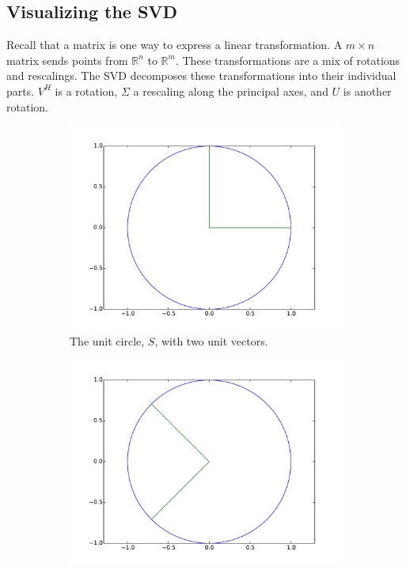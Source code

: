 \subsection*{Visualizing the SVD}

Recall that a matrix is one way to express a linear transformation.
A $m\times n$ matrix sends points from $\mathbb{R}^n$ to $\mathbb{R}^m$.
These transformations are a mix of rotations and rescalings.
The SVD decomposes these transformations into their individual parts.
$V^H$ is a rotation, $\Sigma$ a rescaling along the principal axes, and $U$ is another rotation.


\begin{figure}
\centering
\begin{subfigure}[b]{.49\textwidth}
  \centering
  \includegraphics[width=\textwidth]{unit_circle.pdf}
  \caption{The unit circle, $S$, with two unit vectors.}
\end{subfigure}
\begin{subfigure}[b]{.49\textwidth}
  \centering
  \includegraphics[width=\textwidth]{vcircle.pdf}

\end{subfigure}
\end{figure}
